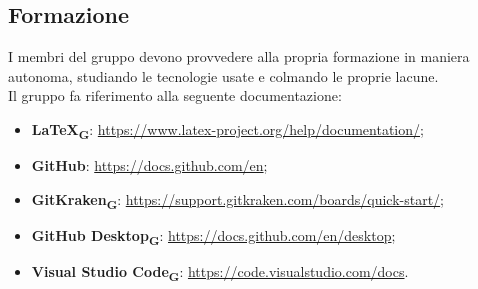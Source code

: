 \subsection{Formazione}
I membri del gruppo devono provvedere alla propria formazione in maniera autonoma, studiando le tecnologie usate e colmando le proprie lacune.\\
Il gruppo fa riferimento alla seguente documentazione:
\begin {itemize}
\item \textbf{\LaTeX\textsubscript{\textbf{G}}}: \url{https://www.latex-project.org/help/documentation/};
\item \textbf{GitHub}: \url{https://docs.github.com/en};
\item \textbf{GitKraken\textsubscript{\textbf{G}}}: \url{https://support.gitkraken.com/boards/quick-start/};
\item \textbf{GitHub Desktop\textsubscript{\textbf{G}}}: \url{https://docs.github.com/en/desktop};
\item \textbf{Visual Studio Code}\textsubscript{\textbf{G}}: \url{https://code.visualstudio.com/docs}.
\end {itemize}